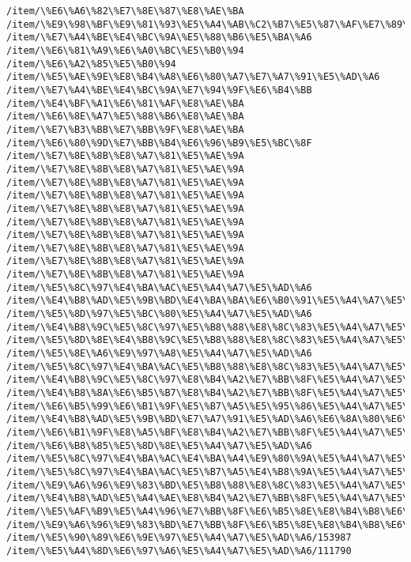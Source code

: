 \documentclass[11pt]{article}
\begin{document}
\begin{Verbatim}[commandchars=\\\{\}]
/item/\%E6\%A6\%82\%E7\%8E\%87\%E8\%AE\%BA
/item/\%E9\%98\%BF\%E9\%81\%93\%E5\%A4\%AB\%C2\%B7\%E5\%87\%AF\%E7\%89\%B9\%E5\%8B\%92
/item/\%E7\%A4\%BE\%E4\%BC\%9A\%E5\%88\%B6\%E5\%BA\%A6
/item/\%E6\%81\%A9\%E6\%A0\%BC\%E5\%B0\%94
/item/\%E6\%A2\%85\%E5\%B0\%94
/item/\%E5\%AE\%9E\%E8\%B4\%A8\%E6\%80\%A7\%E7\%A7\%91\%E5\%AD\%A6
/item/\%E7\%A4\%BE\%E4\%BC\%9A\%E7\%94\%9F\%E6\%B4\%BB
/item/\%E4\%BF\%A1\%E6\%81\%AF\%E8\%AE\%BA
/item/\%E6\%8E\%A7\%E5\%88\%B6\%E8\%AE\%BA
/item/\%E7\%B3\%BB\%E7\%BB\%9F\%E8\%AE\%BA
/item/\%E6\%80\%9D\%E7\%BB\%B4\%E6\%96\%B9\%E5\%BC\%8F
/item/\%E7\%8E\%8B\%E8\%A7\%81\%E5\%AE\%9A
/item/\%E7\%8E\%8B\%E8\%A7\%81\%E5\%AE\%9A
/item/\%E7\%8E\%8B\%E8\%A7\%81\%E5\%AE\%9A
/item/\%E7\%8E\%8B\%E8\%A7\%81\%E5\%AE\%9A
/item/\%E7\%8E\%8B\%E8\%A7\%81\%E5\%AE\%9A
/item/\%E7\%8E\%8B\%E8\%A7\%81\%E5\%AE\%9A
/item/\%E7\%8E\%8B\%E8\%A7\%81\%E5\%AE\%9A
/item/\%E7\%8E\%8B\%E8\%A7\%81\%E5\%AE\%9A
/item/\%E7\%8E\%8B\%E8\%A7\%81\%E5\%AE\%9A
/item/\%E7\%8E\%8B\%E8\%A7\%81\%E5\%AE\%9A
/item/\%E5\%8C\%97\%E4\%BA\%AC\%E5\%A4\%A7\%E5\%AD\%A6
/item/\%E4\%B8\%AD\%E5\%9B\%BD\%E4\%BA\%BA\%E6\%B0\%91\%E5\%A4\%A7\%E5\%AD\%A6
/item/\%E5\%8D\%97\%E5\%BC\%80\%E5\%A4\%A7\%E5\%AD\%A6
/item/\%E4\%B8\%9C\%E5\%8C\%97\%E5\%B8\%88\%E8\%8C\%83\%E5\%A4\%A7\%E5\%AD\%A6/134521
/item/\%E5\%8D\%8E\%E4\%B8\%9C\%E5\%B8\%88\%E8\%8C\%83\%E5\%A4\%A7\%E5\%AD\%A6
/item/\%E5\%8E\%A6\%E9\%97\%A8\%E5\%A4\%A7\%E5\%AD\%A6
/item/\%E5\%8C\%97\%E4\%BA\%AC\%E5\%B8\%88\%E8\%8C\%83\%E5\%A4\%A7\%E5\%AD\%A6
/item/\%E4\%B8\%9C\%E5\%8C\%97\%E8\%B4\%A2\%E7\%BB\%8F\%E5\%A4\%A7\%E5\%AD\%A6
/item/\%E4\%B8\%8A\%E6\%B5\%B7\%E8\%B4\%A2\%E7\%BB\%8F\%E5\%A4\%A7\%E5\%AD\%A6
/item/\%E6\%B5\%99\%E6\%B1\%9F\%E5\%B7\%A5\%E5\%95\%86\%E5\%A4\%A7\%E5\%AD\%A6
/item/\%E4\%B8\%AD\%E5\%9B\%BD\%E7\%A7\%91\%E5\%AD\%A6\%E6\%8A\%80\%E6\%9C\%AF\%E5\%A4\%A7\%E5\%AD\%A6
/item/\%E6\%B1\%9F\%E8\%A5\%BF\%E8\%B4\%A2\%E7\%BB\%8F\%E5\%A4\%A7\%E5\%AD\%A6
/item/\%E6\%B8\%85\%E5\%8D\%8E\%E5\%A4\%A7\%E5\%AD\%A6
/item/\%E5\%8C\%97\%E4\%BA\%AC\%E4\%BA\%A4\%E9\%80\%9A\%E5\%A4\%A7\%E5\%AD\%A6/141728
/item/\%E5\%8C\%97\%E4\%BA\%AC\%E5\%B7\%A5\%E4\%B8\%9A\%E5\%A4\%A7\%E5\%AD\%A6/159077
/item/\%E9\%A6\%96\%E9\%83\%BD\%E5\%B8\%88\%E8\%8C\%83\%E5\%A4\%A7\%E5\%AD\%A6/244249
/item/\%E4\%B8\%AD\%E5\%A4\%AE\%E8\%B4\%A2\%E7\%BB\%8F\%E5\%A4\%A7\%E5\%AD\%A6/182071
/item/\%E5\%AF\%B9\%E5\%A4\%96\%E7\%BB\%8F\%E6\%B5\%8E\%E8\%B4\%B8\%E6\%98\%93\%E5\%A4\%A7\%E5\%AD\%A6/434054
/item/\%E9\%A6\%96\%E9\%83\%BD\%E7\%BB\%8F\%E6\%B5\%8E\%E8\%B4\%B8\%E6\%98\%93\%E5\%A4\%A7\%E5\%AD\%A6/426601
/item/\%E5\%90\%89\%E6\%9E\%97\%E5\%A4\%A7\%E5\%AD\%A6/153987
/item/\%E5\%A4\%8D\%E6\%97\%A6\%E5\%A4\%A7\%E5\%AD\%A6/111790

\end{Verbatim}
\end{document}
